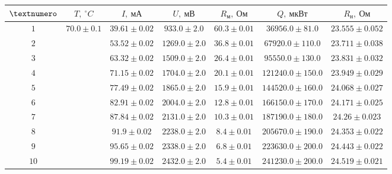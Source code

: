 \begin{tabular}{|c|c|c|c|c|c|c|}
  \hline
  $\textnumero$ & $T,\ ^\circ C$ & $I,\ мА$ & $U,\ мВ$ & $R_м,\ Ом$ & $Q,\ мкВт$ & $R_н,\ Ом$ \\ \hline
  $1$ & \multirow{10}{*}{$70.0 \pm 0.1$} & $39.61 \pm 0.02$ & $933.0 \pm 2.0$ & $60.3 \pm 0.01$ & $36956.0 \pm 81.0$ & $23.555 \pm 0.052$ \\ \cline{1-1} \cline{3-7}
  $2$ & & $53.52 \pm 0.02$ & $1269.0 \pm 2.0$ & $36.8 \pm 0.01$ & $67920.0 \pm 110.0$ & $23.711 \pm 0.038$ \\ \cline{1-1} \cline{3-7}
  $3$ & & $63.32 \pm 0.02$ & $1509.0 \pm 2.0$ & $26.4 \pm 0.01$ & $95550.0 \pm 130.0$ & $23.831 \pm 0.032$ \\ \cline{1-1} \cline{3-7}
  $4$ & & $71.15 \pm 0.02$ & $1704.0 \pm 2.0$ & $20.1 \pm 0.01$ & $121240.0 \pm 150.0$ & $23.949 \pm 0.029$ \\ \cline{1-1} \cline{3-7}
  $5$ & & $77.49 \pm 0.02$ & $1865.0 \pm 2.0$ & $15.9 \pm 0.01$ & $144520.0 \pm 160.0$ & $24.068 \pm 0.027$ \\ \cline{1-1} \cline{3-7}
  $6$ & & $82.91 \pm 0.02$ & $2004.0 \pm 2.0$ & $12.8 \pm 0.01$ & $166150.0 \pm 170.0$ & $24.171 \pm 0.025$ \\ \cline{1-1} \cline{3-7}
  $7$ & & $87.84 \pm 0.02$ & $2131.0 \pm 2.0$ & $10.3 \pm 0.01$ & $187190.0 \pm 180.0$ & $24.26 \pm 0.023$ \\ \cline{1-1} \cline{3-7}
  $8$ & & $91.9 \pm 0.02$ & $2238.0 \pm 2.0$ & $8.4 \pm 0.01$ & $205670.0 \pm 190.0$ & $24.353 \pm 0.022$ \\ \cline{1-1} \cline{3-7}
  $9$ & & $95.65 \pm 0.02$ & $2338.0 \pm 2.0$ & $6.8 \pm 0.01$ & $223630.0 \pm 200.0$ & $24.443 \pm 0.022$ \\ \cline{1-1} \cline{3-7}
  $10$ & & $99.19 \pm 0.02$ & $2432.0 \pm 2.0$ & $5.4 \pm 0.01$ & $241230.0 \pm 200.0$ & $24.519 \pm 0.021$ \\ \hline
\end{tabular}
